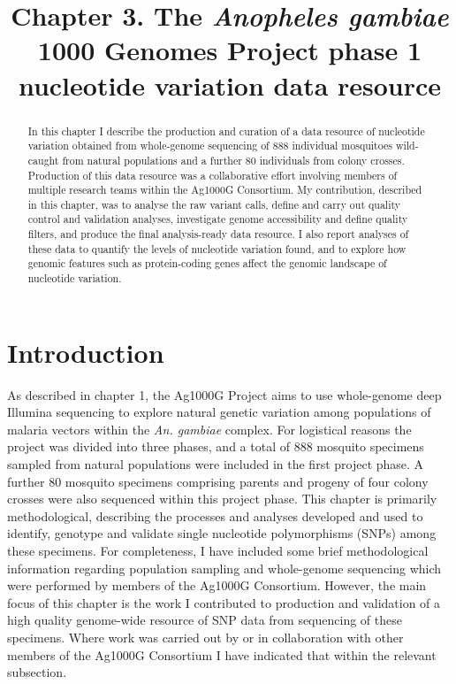 \documentclass[a4paper,11pt,abstracton,hidelinks]{scrartcl}
\title{
Chapter 3. The \textit{Anopheles gambiae} 1000 Genomes Project phase 1 nucleotide variation data resource
}
\author{}
\begin{document}
\renewcommand{\abstractname}{Summary}


\maketitle



\begin{abstract}


In this chapter I describe the production and curation of a data resource of nucleotide variation obtained from whole-genome sequencing of 888 individual mosquitoes wild-caught from natural populations and a further 80 individuals from colony crosses.
%
Production of this data resource was a collaborative effort involving members of multiple research teams within the Ag1000G Consortium.
%
My contribution, described in this chapter, was to analyse the raw variant calls, define and carry out quality control and validation analyses, investigate genome accessibility and define quality filters, and produce the final analysis-ready data resource.
%
I also report analyses of these data to quantify the levels of nucleotide variation found, and to explore how genomic features such as protein-coding genes affect the genomic landscape of nucleotide variation.


\end{abstract}


\tableofcontents


\section{Introduction}


As described in chapter 1, the Ag1000G Project aims to use whole-genome deep Illumina sequencing to explore natural genetic variation among populations of malaria vectors within the \textit{An. gambiae} complex.
%
For logistical reasons the project was divided into three phases, and a total of 888 mosquito specimens sampled from natural populations were included in the first project phase.
%
A further 80 mosquito specimens comprising parents and progeny of four colony crosses were also sequenced within this project phase.
%
This chapter is primarily methodological, describing the processes and analyses developed and used to identify, genotype and validate single nucleotide polymorphisms (SNPs) among these specimens.
%
For completeness, I have included some brief methodological information regarding population sampling and whole-genome sequencing which were performed by members of the Ag1000G Consortium.
%
However, the main focus of this chapter is the work I contributed to production and validation of a high quality genome-wide resource of SNP data from sequencing of these specimens.
%
Where work was carried out by or in collaboration with other members of the Ag1000G Consortium I have indicated that within the relevant subsection.
\end{document}
